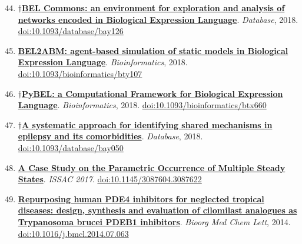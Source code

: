 \documentclass[10pt,a4paper,sans]{moderncv} %
\newcommand{\wikidata}[2]{\href{https://bioregistry.io/wikidata:#1?provider=scholia}{{#2}}}
\begin{document}
    \begin{enumerate}
    \setcounter{enumi}{43}
    \itemsep0.5em
        \item
        $\dagger$\wikidata{Q60302045}{\textbf{BEL Commons: an environment for exploration and analysis of networks encoded in Biological Expression Language}}.
    \textit{Database}, 2018.  {\scriptsize \href{https://bioregistry.io/doi:10.1093/DATABASE/BAY126}{doi:10.1093/database/bay126}}
        \item
        \wikidata{Q51056857}{\textbf{BEL2ABM: agent-based simulation of static models in Biological Expression Language}}.
    \textit{Bioinformatics}, 2018.  {\scriptsize \href{https://bioregistry.io/doi:10.1093/BIOINFORMATICS/BTY107}{doi:10.1093/bioinformatics/bty107}}
        \item
        $\dagger$\wikidata{Q42695788}{\textbf{PyBEL: a Computational Framework for Biological Expression Language}}.
    \textit{Bioinformatics}, 2018.  {\scriptsize \href{https://bioregistry.io/doi:10.1093/BIOINFORMATICS/BTX660}{doi:10.1093/bioinformatics/btx660}}
        \item
        $\dagger$\wikidata{Q55315340}{\textbf{A systematic approach for identifying shared mechanisms in epilepsy and its comorbidities}}.
    \textit{Database}, 2018.  {\scriptsize \href{https://bioregistry.io/doi:10.1093/DATABASE/BAY050}{doi:10.1093/database/bay050}}
    \end{enumerate}
    \begin{enumerate}
    \setcounter{enumi}{47}
    \itemsep0.5em
        \item
        \wikidata{Q47479157}{\textbf{A Case Study on the Parametric Occurrence of Multiple Steady States}}.
    \textit{ISSAC 2017}.  {\scriptsize \href{https://bioregistry.io/doi:10.1145/3087604.3087622}{doi:10.1145/3087604.3087622}}
    \end{enumerate}
    \begin{enumerate}
    \setcounter{enumi}{48}
    \itemsep0.5em
        \item
        \wikidata{Q34138086}{\textbf{Repurposing human PDE4 inhibitors for neglected tropical diseases: design, synthesis and evaluation of cilomilast analogues as Trypanosoma brucei PDEB1 inhibitors}}.
    \textit{Bioorg Med Chem Lett}, 2014.  {\scriptsize \href{https://bioregistry.io/doi:10.1016/J.BMCL.2014.07.063}{doi:10.1016/j.bmcl.2014.07.063}}
    \end{enumerate}
\end{document}
